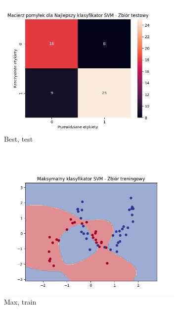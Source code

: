 \documentclass[12pt]{article}
\newcommand*{\subfigwidth}{0.24\textwidth}
\begin{document}
\begin{figure}[H]
\begin{subfigure}[t]{\subfigwidth}
        \includegraphics[width=\linewidth]{img/exp_3/svm/2_3/best/test_matrix.png}
        \caption{Best, test}
    \end{subfigure}
    \\
    \begin{subfigure}[t]{\subfigwidth}
        \includegraphics[width=\linewidth]{img/exp_3/svm/2_3/max/train_boundary.png}
        \caption{Max, train}
    \end{subfigure}
    \hfill
    \begin{subfigure}[t]{\subfigwidth}

\end{subfigure}
\end{figure}
\end{document}
